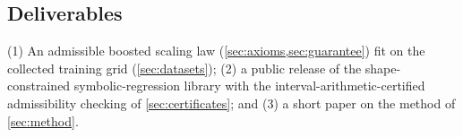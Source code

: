 \documentclass[11pt]{article}
\begin{document}
\subsection{Deliverables}\label{sec:deliverables}
(1) An admissible boosted scaling law (\cref{sec:axioms,sec:guarantee}) fit on the collected training grid (\cref{sec:datasets}); (2) a public release of the shape-constrained symbolic-regression library with the interval-arithmetic-certified admissibility checking of \cref{sec:certificates}; and (3) a short paper on the method of \cref{sec:method}.

\clearpage
\renewcommand{\refname}{References}
\renewcommand{\bibsection}{\section{\refname}}



\clearpage
\end{document}
